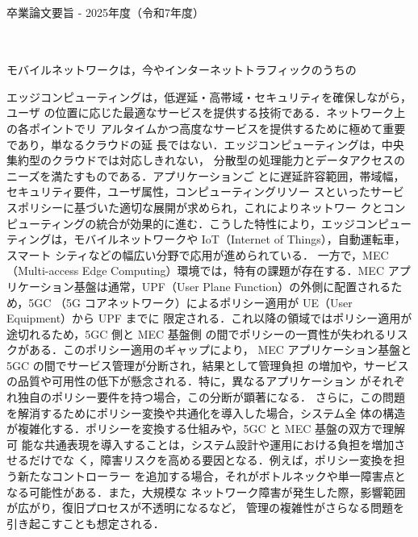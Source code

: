 卒業論文要旨 - 2025年度（令和7年度）
\begin{center}
\begin{large}
\end{large}
\end{center}
\begin{spacing}{1.2}
\small
~ \\

モバイルネットワークは，今やインターネットトラフィックのうちの

エッジコンピューティングは，低遅延・高帯域・セキュリティを確保しながら，ユーザ
の位置に応じた最適なサービスを提供する技術である．ネットワーク上の各ポイントでリ
アルタイムかつ高度なサービスを提供するために極めて重要であり，単なるクラウドの延
長ではない．エッジコンピューティングは，中央集約型のクラウドでは対応しきれない，
分散型の処理能力とデータアクセスのニーズを満たすものである．アプリケーションご
とに遅延許容範囲，帯域幅，セキュリティ要件，ユーザ属性，コンピューティングリソー
スといったサービスポリシーに基づいた適切な展開が求められ，これによりネットワー
クとコンピューティングの統合が効果的に進む．こうした特性により，エッジコンピュー
ティングは，モバイルネットワークや IoT（Internet of Things），自動運転車，スマート
シティなどの幅広い分野で応用が進められている．
一方で，MEC（Multi-access Edge Computing）環境では，特有の課題が存在する．MEC
アプリケーション基盤は通常，UPF（User Plane Function）の外側に配置されるため，5GC
（5G コアネットワーク）によるポリシー適用が UE（User Equipment）から UPF までに
限定される．これ以降の領域ではポリシー適用が途切れるため，5GC 側と MEC 基盤側
の間でポリシーの一貫性が失われるリスクがある．このポリシー適用のギャップにより，
MEC アプリケーション基盤と 5GC の間でサービス管理が分断され，結果として管理負担
の増加や，サービスの品質や可用性の低下が懸念される．特に，異なるアプリケーション
がそれぞれ独自のポリシー要件を持つ場合，この分断が顕著になる．
さらに，この問題を解消するためにポリシー変換や共通化を導入した場合，システム全
体の構造が複雑化する．ポリシーを変換する仕組みや，5GC と MEC 基盤の双方で理解可
能な共通表現を導入することは，システム設計や運用における負担を増加させるだけでな
く，障害リスクを高める要因となる．例えば，ポリシー変換を担う新たなコントローラー
を追加する場合，それがボトルネックや単一障害点となる可能性がある．また，大規模な
ネットワーク障害が発生した際，影響範囲が広がり，復旧プロセスが不透明になるなど，
管理の複雑性がさらなる問題を引き起こすことも想定される．

\end{spacing}
